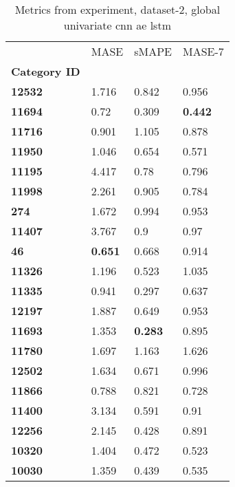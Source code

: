 \begin{table}[H]
\centering
\caption{Metrics from experiment, dataset-2, global univariate cnn ae lstm}
\label{table:global-univariate-cnn-ae-lstm-dataset-2}
\begin{tabular}{llll}
\toprule
{} &            MASE &           sMAPE &          MASE-7 \\
\textbf{Category ID} &                 &                 &                 \\
\midrule
\textbf{12532      } &           1.716 &           0.842 &           0.956 \\
\textbf{11694      } &            0.72 &           0.309 &  \textbf{0.442} \\
\textbf{11716      } &           0.901 &           1.105 &           0.878 \\
\textbf{11950      } &           1.046 &           0.654 &           0.571 \\
\textbf{11195      } &           4.417 &            0.78 &           0.796 \\
\textbf{11998      } &           2.261 &           0.905 &           0.784 \\
\textbf{274        } &           1.672 &           0.994 &           0.953 \\
\textbf{11407      } &           3.767 &             0.9 &            0.97 \\
\textbf{46         } &  \textbf{0.651} &           0.668 &           0.914 \\
\textbf{11326      } &           1.196 &           0.523 &           1.035 \\
\textbf{11335      } &           0.941 &           0.297 &           0.637 \\
\textbf{12197      } &           1.887 &           0.649 &           0.953 \\
\textbf{11693      } &           1.353 &  \textbf{0.283} &           0.895 \\
\textbf{11780      } &           1.697 &           1.163 &           1.626 \\
\textbf{12502      } &           1.634 &           0.671 &           0.996 \\
\textbf{11866      } &           0.788 &           0.821 &           0.728 \\
\textbf{11400      } &           3.134 &           0.591 &            0.91 \\
\textbf{12256      } &           2.145 &           0.428 &           0.891 \\
\textbf{10320      } &           1.404 &           0.472 &           0.523 \\
\textbf{10030      } &           1.359 &           0.439 &           0.535 \\
\bottomrule
\end{tabular}
\end{table}
